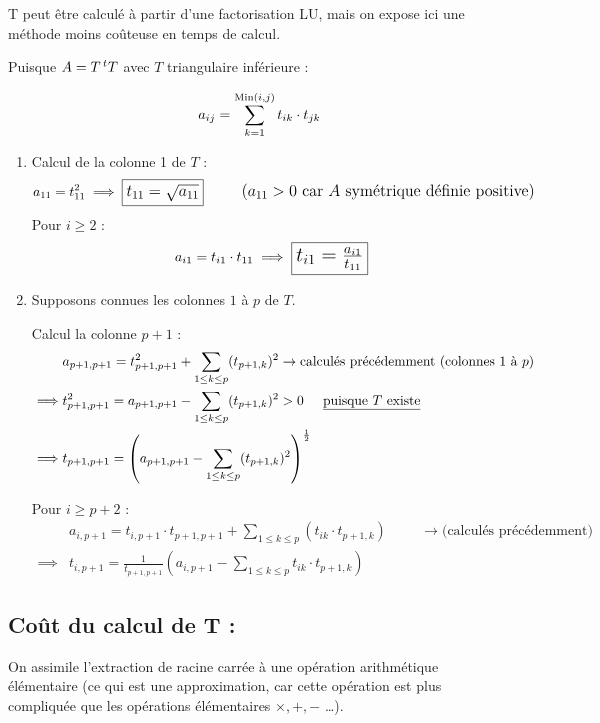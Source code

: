 T peut être calculé à partir d'une factorisation LU, mais on expose ici une méthode moins coûteuse en temps de calcul.

Puisque $A = T \,^tT$ avec $T$ triangulaire inférieure :

\[
    a_{ij} = \sum_{k = 1}^{\operatorname{Min}(i, j)} t_{ik} \cdot t_{jk}
\]

\begin{enumerate}[label=-]
    \item Calcul de la colonne 1 de $T$ :
        \[
            a_{11} = t_{11}^2 \implies \large{\fbox{$t_{11} = \sqrt{a_{11}}$}} \hspace{1cm} 
            \text{($a_{11} > 0$ car $A$ symétrique définie positive)}
        \]
        Pour $i \geq 2$ :
        \[
            a_{i1} = t_{i1} \cdot t_{11} \implies \Large{\fbox{$t_{i1} = \frac{a_{i1}}{t_{11}}$}}
        \]
    \item Supposons connues les colonnes $1$ à $p$ de $T$.

Calcul la colonne $p+1$ :
        \begin{align*}
            & a_{p+1,p+1} = t_{p+1,p+1}^2 + \sum_{1 \leq k \leq p}(t_{p+1,k})^2 \to
            \text{calculés précédemment (colonnes 1 à $p$)} \\
            \implies & t_{p+1,p+1}^2 = a_{p+1,p+1} - \sum_{1 \leq k \leq p}(t_{p+1,k})^2 > 0 \hspace{0.5cm} \text{\underline{puisque $T$ existe}} \\
            \implies & t_{p+1,p+1} = \left(a_{p+1,p+1} - \sum_{1 \leq k \leq p}(t_{p+1,k})^2\right)^{\frac{1}{2}}
        \end{align*}

        Pour $i \geq p+2$ :
        \begin{equation*}
            \begin{split}
                & a_{i,p+1} = t_{i,p+1} \cdot t_{p+1,p+1} + \sum_{1 \leq k \leq p}(t_{ik} \cdot t_{p+1,k})
            \hspace{1cm} \to \text{(calculés précédemment)} \\
                \implies & t_{i,p+1} = \frac{1}{t_{p+1,p+1}} \left ( a_{i,p+1} - \sum_{1 \leq k \leq p} t_{ik} \cdot t_{p+1,k} \right )
            \end{split}
        \end{equation*}

\end{enumerate}

\subsection*{Coût du calcul de T :}
On assimile l'extraction de racine carrée à une opération arithmétique élémentaire (ce qui est
une approximation, car cette opération est plus compliquée que les opérations élémentaires
$\times, +, -$ \dots).

